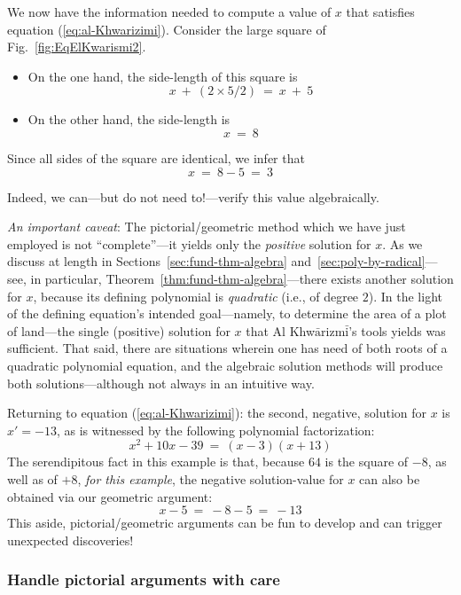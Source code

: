 \smallskip

We now have the information needed to compute a value of $x$ that satisfies equation (\ref{eq:al-Khwarizimi}).  Consider the large square of Fig.~\ref{fig:EqElKwarismi2}.

\begin{itemize}
\item
On the one hand, the side-length of this square is
\[ x \ + \ (2 \times 5/2) \ = \ x \ + \ 5 \]

\item
On the other hand, the side-length is
\[ x \ = \ 8 \]
\end{itemize}
Since all sides of the square are identical, we infer that
\[ x \ = \ 8-5 \ = \ 3 \]

\noindent
Indeed, we can---but do not need to!---verify this value algebraically.

\medskip

\noindent
{\em An important caveat}: The pictorial/geometric method which we have just employed is not ``complete''---it yields only the {\em positive} solution for $x$.  As we discuss at length in Sections~\ref{sec:fund-thm-algebra} and~\ref{sec:poly-by-radical}---see, in particular, Theorem~\ref{thm:fund-thm-algebra}---there exists another solution for $x$, because its defining polynomial is {\em quadratic} (i.e., of degree $2$).  In the light of the defining equation's intended goal---namely, to determine the area of a plot of land---the single (positive) solution for $x$ that Al Khw$\bar{\mbox{a}}$rizm$\bar{\mbox{i}}$'s tools yields was sufficient.  That said, there are situations wherein one has need of both roots of a quadratic polynomial equation, and the algebraic solution methods will produce both solutions---although not always in an intuitive way.

\medskip

Returning to equation (\ref{eq:al-Khwarizimi}):  the second, negative, solution for $x$  is $x' = -13$, as is witnessed by the following polynomial factorization:
\[ x^2 + 10x - 39 \ = \ (x-3)(x+13) \]
The serendipitous fact in this example is that, because $64$ is the square of $-8$, as well as of $+8$, {\em for this example}, the negative solution-value for $x$ can also be obtained via our geometric argument:
\[ x - 5 \ = \ -8 -5 \ = \ -13 \]
This aside, pictorial/geometric arguments can be fun to develop and can trigger unexpected discoveries!


\subsubsection{Handle pictorial arguments with care}

